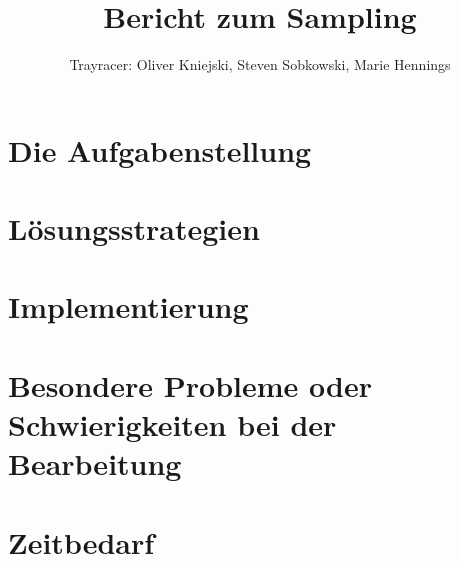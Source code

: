 \documentclass[a4paper,parskip=half,11pt]{scrartcl}
\author{Trayracer: Oliver Kniejski, Steven Sobkowski, Marie Hennings}
\title{Bericht zum Sampling}
\begin{document}
 
\maketitle

\section*{Die Aufgabenstellung}


\section*{Lösungsstrategien}


\section*{Implementierung}


\section*{Besondere Probleme oder Schwierigkeiten bei der Bearbeitung}


\section*{Zeitbedarf}
\end{document}
